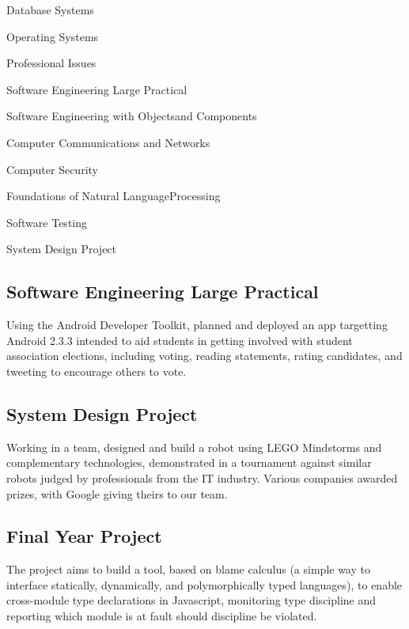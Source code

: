 \documentclass[sans,a4paper]{moderncv}   %
\begin{document}
{\begin{itemize}
\begin{multicols}{2}
		\item Database Systems
		\item Operating Systems
		\item Professional Issues
		\item Software Engineering Large Practical
		\item Software Engineering with Objects\newline{}and Components
		\item Computer Communications and Networks
		\item Computer Security
		\item Foundations of Natural Language\newline{}Processing
		\item Software Testing
		\item System Design Project
		\end{multicols}
		\end{itemize}
%
		\subsection{\hspace{-8em}Software Engineering Large Practical}
		Using the Android Developer Toolkit, planned and deployed an app targetting Android 2.3.3 intended to aid students in getting involved with student association elections, including voting, reading statements, rating candidates, and tweeting to encourage others to vote.
%
		\subsection{\hspace{-8em}System Design Project}
		Working in a team, designed and build a robot using LEGO Mindstorms and complementary technologies, demonstrated in a tournament against similar robots judged by professionals from the IT industry. Various companies awarded prizes, with Google giving theirs to our team.
%
		\subsection{\hspace{-8em}Final Year Project}
		The project aims to build a tool, based on blame calculus (a simple way to interface statically, dynamically, and polymorphically typed languages), to enable cross-module type declarations in Javascript, monitoring type discipline and reporting which module is at fault should discipline be violated.
	}
\end{document}

